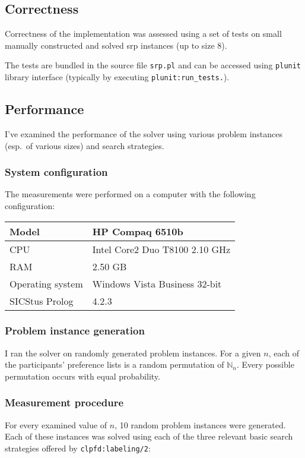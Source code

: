 \documentclass{article}
\newcommand{\nn}{\mathbb{N}_n}
\newcommand{\file}[1]{\texttt{#1}}
\newcommand{\code}[1]{\texttt{#1}}
\newcommand{\prolog}{Prolog}
\newcommand{\sicstusprolog}{SICStus \prolog{}}
\newcommand{\srp}{\acrshort{srp}}
\begin{document}
\subsection{Correctness}
Correctness of the implementation was assessed using a set of tests on small
manually constructed and solved \srp{} instances (up to size 8).

The tests are bundled in the source file \file{srp.pl}
and can be accessed using \code{plunit} library interface
(typically by executing \code{plunit:run\_tests.}).

\subsection{Performance}
I've examined the performance of the solver using various problem instances
(esp.~of various sizes) and search strategies.

\subsubsection{System configuration}
The measurements were performed on a computer with the following configuration:

\begin{tabular}{| l | l |}
\hline
Model & HP Compaq 6510b \\
\hline
CPU & Intel Core2 Duo T8100 2.10 GHz \\
\hline
RAM & 2.50 GB \\
\hline
Operating system & Windows Vista Business 32-bit \\
\hline
\sicstusprolog{} & 4.2.3 \\
\hline
\end{tabular}

\subsubsection{Problem instance generation}
I ran the solver on randomly generated problem instances.
For a given $n$, each of the participants' preference lists
is a random permutation of $\nn$.
Every possible permutation occurs with equal probability.

\subsubsection{Measurement procedure}
For every examined value of $n$, 10 random problem instances were generated.
Each of these instances was solved using each of the three relevant basic
search strategies offered by \code{clpfd:labeling/2}:
\end{document}
